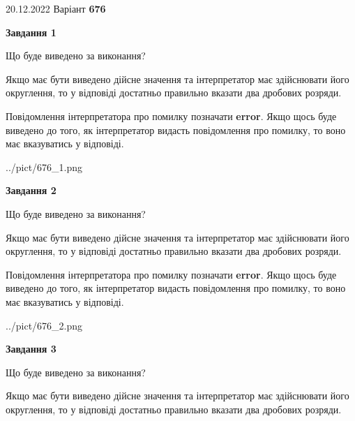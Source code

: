 \documentclass[12pt, ukrainian]{article}
\begin{document}
{20.12.2022 Варіант \No \textbf { 676 }\par}
{
\begin {Large}

{\begin {center}\textbf{Завдання 1}\end {center}}\par
Що буде виведено за виконання? \par

Якщо має бути виведено дійсне значення та інтерпретатор має здійснювати його округлення, 
то у відповіді достатньо правильно вказати два дробових розряди.

Повідомлення інтерпретатора про помилку позначати \textbf{error}.
Якщо щось буде виведено до того, як інтерпретатор видасть повідомлення про помилку, 
то воно має вказуватись у відповіді. \par

\begin{center}
	{../pict/676_1.png}
\end{center}
\newpage

{\begin {center}\textbf{Завдання 2}\end {center}}\par
Що буде виведено за виконання? \par

Якщо має бути виведено дійсне значення та інтерпретатор має здійснювати його округлення, 
то у відповіді достатньо правильно вказати два дробових розряди.

Повідомлення інтерпретатора про помилку позначати \textbf{error}.
Якщо щось буде виведено до того, як інтерпретатор видасть повідомлення про помилку, 
то воно має вказуватись у відповіді. \par

\begin{center}
	{../pict/676_2.png}
\end{center}
\newpage

{\begin {center}\textbf{Завдання 3}\end {center}}\par
Що буде виведено за виконання? \par

Якщо має бути виведено дійсне значення та інтерпретатор має здійснювати його округлення, 
то у відповіді достатньо правильно вказати два дробових розряди.


\end{Large}}
\end{document}
